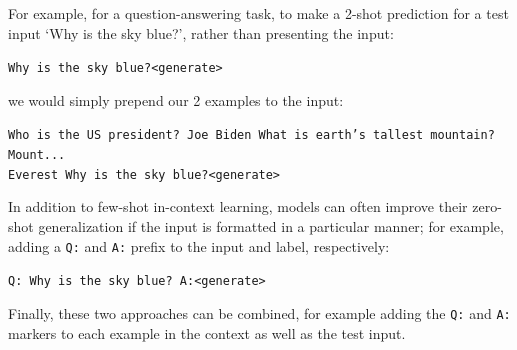 \documentclass[12pt]{article}
\begin{document}
    For example, for a question-answering task, to make a 2-shot prediction for a test input `Why is the sky blue?', rather than presenting the input:

    \texttt{Why is the sky blue?\textless generate\textgreater}

    we would simply prepend our 2 examples to the input:

    \texttt{Who is the US president? Joe Biden What is earth's tallest mountain? Mount... \\
    Everest Why is the sky blue?\textless generate\textgreater}

    In addition to few-shot in-context learning, models can often improve their zero-shot generalization if the input is formatted in a particular manner; for example, adding a \texttt{Q:} and \texttt{A:} prefix to the input and label, respectively:

    \texttt{Q: Why is the sky blue? A:\textless generate\textgreater}

    Finally, these two approaches can be combined, for example adding the \texttt{Q:} and \texttt{A:} markers to each example in the context as well as the test input.
\end{document}
